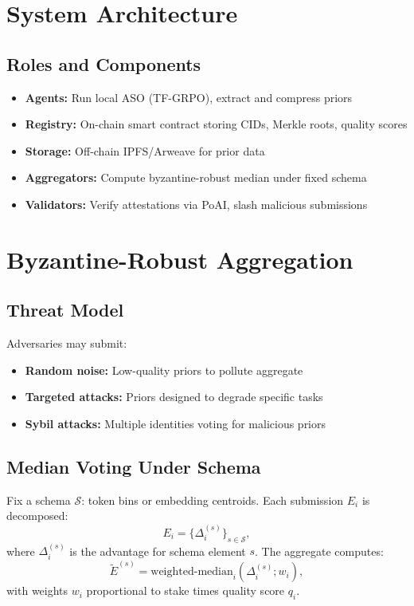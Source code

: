 \documentclass[11pt]{article}
\begin{document}
\section{System Architecture}
\subsection{Roles and Components}
\begin{itemize}[leftmargin=1.1em]
  \item \textbf{Agents:} Run local ASO (TF-GRPO), extract and compress priors
  \item \textbf{Registry:} On-chain smart contract storing CIDs, Merkle roots, quality scores
  \item \textbf{Storage:} Off-chain IPFS/Arweave for prior data
  \item \textbf{Aggregators:} Compute byzantine-robust median under fixed schema
  \item \textbf{Validators:} Verify attestations via PoAI, slash malicious submissions
\end{itemize}




\section{Byzantine-Robust Aggregation}
\subsection{Threat Model}
Adversaries may submit:
\begin{itemize}[leftmargin=1.1em]
  \item \textbf{Random noise:} Low-quality priors to pollute aggregate
  \item \textbf{Targeted attacks:} Priors designed to degrade specific tasks
  \item \textbf{Sybil attacks:} Multiple identities voting for malicious priors
\end{itemize}

\subsection{Median Voting Under Schema}
Fix a schema \(\mathcal{S}\): token bins or embedding centroids. Each submission \(E_i\) is decomposed:
\begin{equation}
E_i = \{\Delta_i^{(s)}\}_{s \in \mathcal{S}},
\end{equation}
where \(\Delta_i^{(s)}\) is the advantage for schema element \(s\). The aggregate computes:
\begin{equation}
\tilde{E}^{(s)} = \text{weighted-median}_i(\Delta_i^{(s)}; w_i),
\end{equation}
with weights \(w_i\) proportional to stake times quality score \(q_i\).
\end{document}
